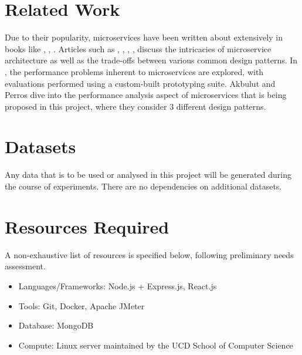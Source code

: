 \section{Related Work}
Due to their popularity, microservices have been written about extensively in books like \cite{richardson18}, \cite{kleppmann17}, \cite{newman14}. Articles such as \cite{md19}, \cite{md20}, \cite{sahiti20}, \cite{udantha19}, \cite{lewis14} discuss the intricacies of microservice architecture as well as the trade-offs between various common design patterns. In \cite{cully20}, the performance problems inherent to microservices are explored, with evaluations performed using a custom-built prototyping suite. Akbulut and Perros \cite{akbulut19} dive into the performance analysis aspect of microservices that is being proposed in this project, where they consider 3 different design patterns.

\section{Datasets}
Any data that is to be used or analysed in this project will be generated during the course of experiments. There are no dependencies on additional datasets.

\section{Resources Required}

A non-exhaustive list of resources is specified below, following preliminary needs assessment.

\begin{itemize}
	\item Languages/Frameworks: Node.js + Express.js, React.js
	\item Tools: Git, Docker, Apache JMeter
	\item Database: MongoDB
	\item Compute: Linux server maintained by the UCD School of Computer Science
\end{itemize}


